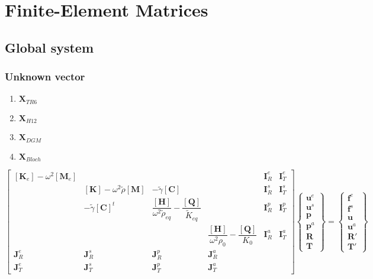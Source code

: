 \documentclass[11pt,A4paper]{book}
\newcommand{\tb}{\textbf}
\newcommand{\wdt}[1]{\widetilde{#1}}
\renewcommand{\:}{\tb{:}}
\begin{document}
\chapter{Finite-Element Matrices}

\section{Global system}

\subsection{Unknown vector}

\begin{enumerate}
\item $\tb{X}_{TR6}$
\item $\tb{X}_{H12}$
\item $\tb{X}_{DGM}$
\item $\tb{X}_{Bloch}$
\end{enumerate}



\begin{equation}
\left[
\begin{array}{cccc|cc}
{[\tb{K}_e]-\omega^2[\tb{M}_e]}&&&&{\tb{I}_R^e}&{\tb{I}_T^e}\\ 
&{[\tb{K}]-\omega^2\wdt{\rho}[\tb{M}]}&{-\wdt{\gamma}[\tb{C}]}&&{\tb{I}_R^s}&{\tb{I}_T^s}\\ 
&{-\wdt{\gamma}[\tb{C}]^t} & {\dfrac{[\tb{H}]}{\omega^2\wdt{\rho}_{eq}}-\dfrac{[\tb{Q}]}{\wdt{K}_{eq}}}&&{\tb{I}_R^p}&{\tb{I}_T^p} \\
&{} & &{\dfrac{[\tb{H}]}{\omega^2{\rho}_{0}}-\dfrac{[\tb{Q}]}{{K}_{0}}} &{\tb{I}_R^a}&{\tb{I}_T^a}\\ \hline
{\tb{J}_R^e}&{\tb{J}_R^s}&{\tb{J}_R^p}&{\tb{J}_R^a}\\
{\tb{J}_T^e}&{\tb{J}_T^s}&{\tb{J}_T^p}&{\tb{J}_T^a}
\end{array}
\right]
\left\{
\begin{array}{c}
\tb{u}^e\\
\tb{u}^s\\
\tb{p}\\
\tb{p}^a\\ \hline
\tb{R}\\
\tb{T}
\end{array}
\right\}
=
\left\{
\begin{array}{c}
\tb{f}^e\\
\tb{f}^s\\
\tb{u}\\
\tb{u}^a\\ \hline
\tb{R}'\\
\tb{T}'
\end{array}
\right\}
\end{equation}
\end{document}
